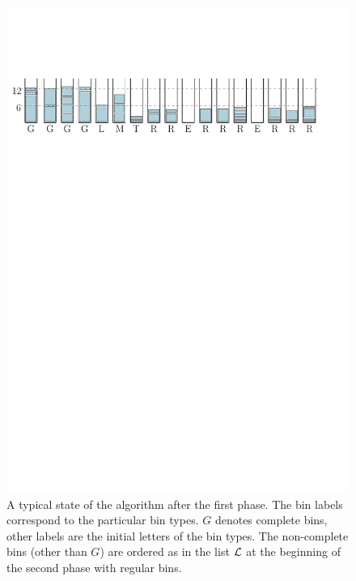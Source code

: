 \begin{figure}[th]
\begin{center}
\includegraphics[width=\textwidth]{img/first_phase.pdf}
\end{center}
\caption{A typical state of the algorithm after the first phase. The bin labels correspond to the particular bin types. $G$ denotes complete bins, other labels are the initial letters of the bin types. The non-complete bins (other than $G$) are ordered as in
  the list ${\mathcal L}$ at the beginning of the second phase with regular
  bins.}
\label{fig:1}
\end{figure}



